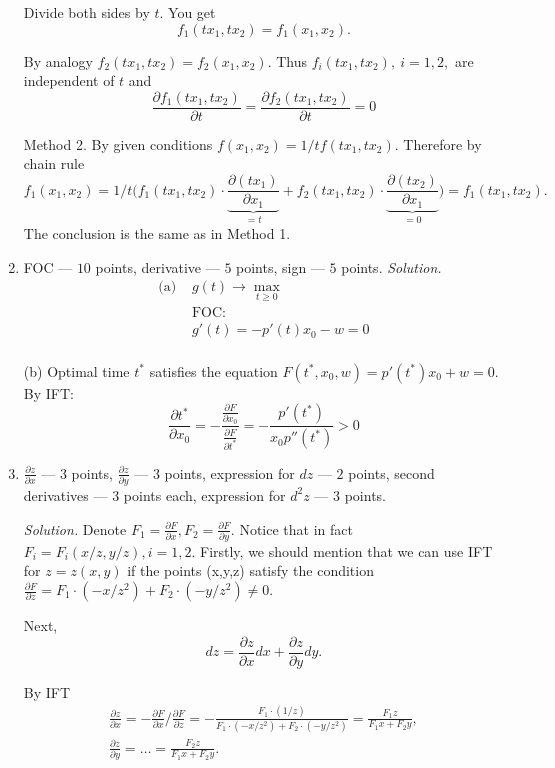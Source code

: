 \begin{enumerate}
Divide both sides by $t.$ You get
$$
f_1(tx_1,tx_2) = f_1(x_1,x_2).
$$

By analogy $f_2(tx_1,tx_2) = f_2(x_1,x_2).$ Thus $f_i(tx_1,tx_2), \ i=1,2,$ are independent of $t$ and
\[
\frac{\partial f_1 (tx_1,tx_2)}{\partial t} = \frac{\partial f_2 (tx_1,tx_2)}{\partial t} = 0
\]

\noindent Method 2. By given conditions $f(x_1, x_2) = 1/t f(tx_1,tx_2).$ Therefore by chain rule
\[
f_1(x_1,x_2)=1/t \bigl(f_1 (tx_1,tx_2)\cdot\underbrace{\frac{\partial (tx_1)}{\partial x_1}}_{=t} +  f_2 (tx_1,tx_2)\cdot\underbrace{\frac{\partial (tx_2)}{\partial x_1}}_{=0}\bigr)=f_1(tx_1,tx_2).
\]
The conclusion is the same as in Method 1.


\item FOC --- $10$ points, derivative --- $5$ points, sign --- $5$ points.
\textit{Solution.}
\begin{equation*}
\begin{array}{ll}
\text{(a) }& g(t) \rightarrow \max_{t\geq0}\\
&\text{FOC:}\\
&g'(t) = -p'(t)x_0-w =0\\
\end{array}
\end{equation*}


(b) Optimal time $t^*$ satisfies the equation $F(t^*, x_0,w) = p'(t^*)x_0+w=0$. By IFT:
\begin{equation*}
\frac {\partial t^*}{\partial x_0} = - \frac {\frac {\partial F}{\partial x_0}} {\frac {\partial F}{\partial t^*}} = -\frac{p'(t^*)}{x_0p''(t^*)} > 0
\end{equation*}


\item $\frac{\partial z}{\partial x}$ --- $3$ points, $\frac{\partial z}{\partial y}$ --- $3$ points, expression for $dz$ --- $2$ points, second derivatives --- $3$ points each, expression for $d^2 z$ --- $3$ points.

\textit{Solution.} Denote $F_1 = \frac{\partial F}{\partial x}, F_2 = \frac{\partial F}{\partial y}.$ Notice that in fact $F_i=F_i(x/z,y/z), i=1,2.$
Firstly, we should mention that we can use IFT for $z=z(x,y)$ if the points (x,y,z) satisfy the condition $\frac{\partial F}{\partial z} = F_1 \cdot (-x/z^2)+ F_2 \cdot (-y/z^2)\neq 0.$

Next,
$$
dz = \frac{\partial z}{\partial x}dx+\frac{\partial z}{\partial y}dy.
$$

By IFT
\begin{gather*}
\frac{\partial z}{\partial x} = -\frac{\partial F}{\partial x}/\frac{\partial F}{\partial z} =-\frac{F_1\cdot (1/z)}{F_1\cdot(-x/z^2)+F_2\cdot(-y/z^2)}=\frac{F_1 z}{F_1 x+F_2 y}, \\ \frac{\partial z}{\partial y} =\dots= \frac{F_2 z}{F_1 x+F_2 y}.
\end{gather*}


\end{enumerate}
